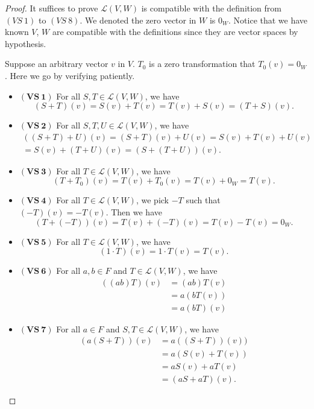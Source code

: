 \begin{Exercise}
	\begin{proof}
		It suffices to prove $\mathcal{L}(V,W)$ is compatible with the definition from $(VS\ 1)$ to $(VS\ 8)$. We denoted the zero vector in $W$ is $0_W$. Notice that we have known $V$, $W$ are compatible with the definitions since they are vector spaces by hypothesis.
		
		Suppose an arbitrary vector $v$ in $V$. $T_0$ is a zero transformation that $T_0(v) = 0_W$. Here we go by verifying patiently.
		
		\begin{itemize}
			\item $\mathbf{(VS\ 1)}$
			For all $S,T \in \mathcal{L}(V,W)$, we have
			$$
			(S+T)(v)
			= S(v) + T(v)
			= T(v) + S(v)
			= (T+S)(v).
			$$
			
			\item $\mathbf{(VS\ 2)}$
			For all $S,T,U\in \mathcal{L}(V,W)$, we have
			\begin{gather*}
			((S+T)+U)(v)
			= (S+T)(v) + U(v)
			= S(v) + T(v) + U(v) \\
			= S(v) + (T+U)(v) 
			= (S+(T+U))(v).
			\end{gather*}
			
			\item $\mathbf{(VS\ 3)}$
			For all $T\in \mathcal{L}(V,W)$, we have
			$$
			(T+T_0)(v)
			= T(v) + T_0(v)
			= T(v) + 0_W
			= T(v).
			$$
			
			\item $\mathbf{(VS\ 4)}$
			For all $T\in \mathcal{L}(V,W)$, we pick $-T$ such that $(-T)(v) = -T(v)$. Then we have
			$$
			(T+(-T))(v)
			= T(v) + (-T)(v)
			= T(v) - T(v)
			= 0_W.
			$$
			
			\item $\mathbf{(VS\ 5)}$
			For all $T\in \mathcal{L}(V,W)$, we have
			$$
			(1\cdot T)(v)
			= 1\cdot T(v)
			= T(v).
			$$
			
			\item $\mathbf{(VS\ 6)}$
			For all $a,b\in F$ and $T\in \mathcal{L}(V,W)$, we have
			\begin{align*}
			((ab)T)(v)
			&= (ab)T(v) \\
			&= a(b T(v)) \\
			&= a(b T)(v)
			\end{align*}
			
			\item $\mathbf{(VS\ 7)}$
			For all $a\in F$ and $S,T\in \mathcal{L}(V,W)$, we have
			\begin{align*}
			(a(S+T))(v)
			&= a((S+T))(v)) \\
			&= a(S(v) + T(v)) \\
			&= a S(v) + a T(v) \\
			&= (a S+a T)(v).
			\end{align*}
			

\end{itemize}
\end{proof}
\end{Exercise}
